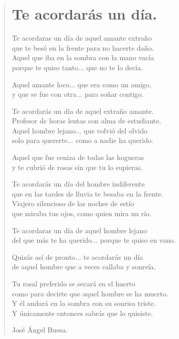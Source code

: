 \documentclass[11pt, portrait, twoside, notitlepage, openright]{book}
\begin{document}
\newpage
\begin{verse}
\begin{center}
\section{Te acordarás un día.}
\end{center}
Te acordaras un día de aquel amante extraño\\
que te besó en la frente para no hacerte daño.\\
Aquel que iba en la sombra con la mano vacía\\
porque te quiso tanto... que no te lo decía.
\newline

Aquel amante loco... que era como un amigo,\\
y que se fue con otra... para soñar contigo.
\newline

Te acordarás un día de aquel extraño amante.\\
Profesor de horas lentas con alma de estudiante.\\
Aquel hombre lejano... que volvió del olvido\\
solo para quererte... como a nadie ha querido.
\newline

Aquel que fue ceniza de todas las hogueras\\
y te cubrió de rosas sin que tu lo supieras.
\newline

Te acordarás un día del hombre indiferente\\
que en las tardes de lluvia te besaba en la frente.\\
Viajero silencioso de las noches de estío\\
que miraba tus ojos, como quien mira un río.
\newline

Te acordaras un día de aquel hombre lejano\\
del que más te ha querido... porque te quiso en vano.
\newpage

Quizás así de pronto... te acordarás un día\\
de aquel hombre que a veces callaba y sonreía.
\newline

Tu rosal preferido se secará en el huerto\\
como para decirte que aquel hombre se ha muerto.\\
Y él andará en la sombra con su sonrisa triste.\\
Y únicamente entonces sabrás que lo quisiste.
\newline

José Ángel Buesa.
\end{verse}
\end{document}
